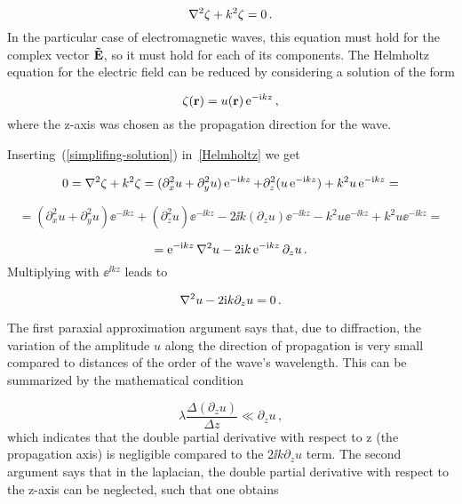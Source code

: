 \documentclass[12pt, class=report, crop=false]{standalone}
\begin{document}
\begin{equation}
\label{Helmholtz}
  \laplacian{\zeta} + k^2 \zeta =0 \,.
\end{equation}
In the particular case of electromagnetic waves, this equation must hold for the complex vector \(\vb{\tilde{E}}\), so it must hold for each of its components. The Helmholtz equation for the electric field can be reduced by considering a solution of the form

\begin{equation}
\label{simplifing-solution}
  \zeta (\vb{r}) = u (\vb{r}) \operatorname{e}^{-\mathrm{i} kz} \,,
\end{equation}
where the z-axis was chosen as the propagation direction for the wave.

\par
Inserting~(\ref{simplifing-solution}) in~\cref{Helmholtz} we get

\begin{equation*}
  0 = \laplacian{\zeta} + k^2 \zeta = (\partial_x^2 u + \partial_y^2 u) \ee^{-\ii kz} + \partial_z^2 (u \ee^{-\ii kz}) + k^2 u \ee^{-\ii kz} =
\end{equation*}

\begin{equation*}
  = (\partial_x^2 u + \partial_y^2 u) \ee^{-\ii kz} + (\partial_z^2 u) \ee^{-\ii kz} - 2 \ii k (\partial_z u) \ee^{-\ii kz} - k^2 u\ee^{-\ii kz} + k^2 u \ee^{-\ii kz} =
\end{equation*}

\begin{equation*}
  = \ee^{-\ii kz} \laplacian{u} - 2 \ii k \ee^{-\ii kz} \partial_z u\,.
\end{equation*}
Multiplying with \(\ee^{\ii kz}\) leads to

\begin{equation}
  \laplacian{u} - 2 \ii k \partial_z u = 0\,.
\end{equation}

\par
The first paraxial approximation argument says that, due to diffraction, the variation of the amplitude \(u\) along the direction of propagation is very small compared to distances of the order of the wave's wavelength. This can be summarized by the mathematical condition

\begin{equation}
  \lambda \frac{\Delta (\partial_z u)}{\Delta z} \ll \partial_z u \,,
\end{equation}
which indicates that the double partial derivative with respect to z (the propagation axis) is negligible compared to the \(2 \ii k \partial_z u\) term. The second argument says that in the laplacian, the double partial derivative with respect to the z-axis can be neglected, such that one obtains
\end{document}
